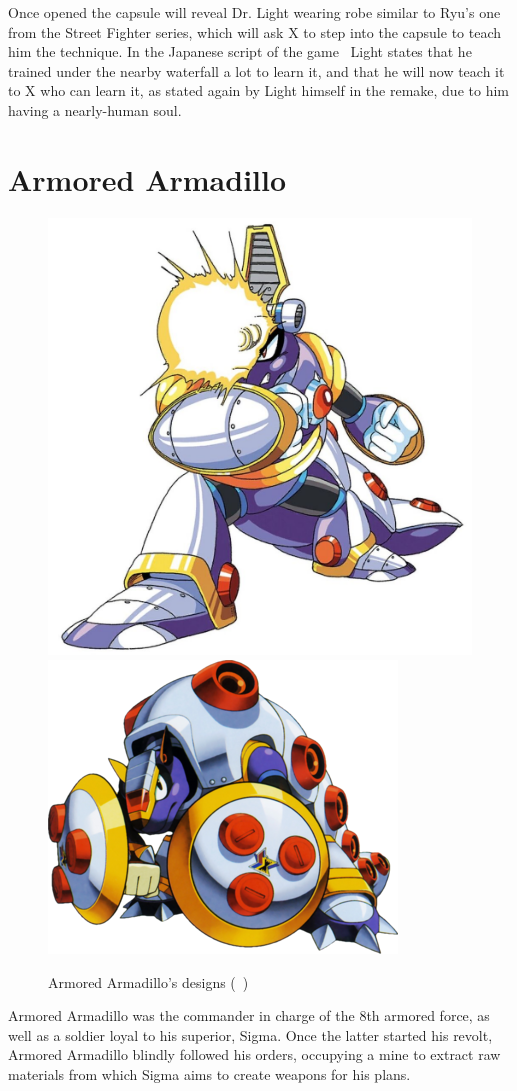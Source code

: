 Once opened the capsule will reveal Dr. Light wearing robe similar to Ryu's one from the Street Fighter series, which will ask X to step into the capsule to teach him the technique. In the Japanese  script of the game~\cite{wordpress:X_japanese_script} Light states that he trained under the nearby waterfall a lot to learn it, and that he will now teach it to X who can learn it, as stated again by Light himself in the remake, due to him having a nearly-human soul.


\section{Armored Armadillo}\label{boss:Armored_Armadillo}
\begin{figure}[htp]
	\centering
	\includegraphics[width=0.3\linewidth]{figures/X1/Armored_armadillo/Armored_armadillo.jpg}
	\includegraphics[width=0.4\linewidth]{figures/X1/Armored_armadillo/MHXArmoredArmadillo.png}
	\caption{Armored Armadillo's designs (~\cite{book:MMX_Complete_art})}
\end{figure}
Armored Armadillo was the commander in charge of the 8th armored force, as well as a soldier loyal to his superior, Sigma. Once the latter started his revolt, Armored Armadillo blindly followed his orders, occupying a mine to extract raw materials from which Sigma aims to create weapons for his plans.


